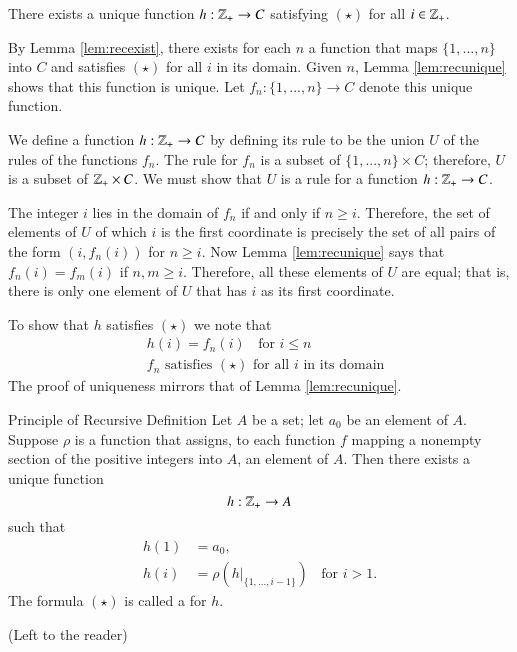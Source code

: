 \documentclass[12pt, a4paper, twoside, openright, titlepage]{book}
\begin{document}
\begin{appendices}
    \begin{thm}{}{}
        There exists a unique function $h:\mathbb Z_+\rightarrow C$ satisfying $(\star)$ for all $i \in \mathbb Z_+$.
    \end{thm}
    \begin{proof*}{}{}
        By Lemma \ref{lem:recexist}, there exists for each $n$ a function that maps $\{1,...,n\}$ into $C$ and satisfies $(\star)$ for all $i$ in its domain. Given $n$, Lemma \ref{lem:recunique} shows that this function is unique. Let $f_n:\{1,...,n\}\rightarrow C$ denote this unique function.


        We define a function $h:\mathbb Z_+\rightarrow C$ by defining its rule to be the union $U$ of the rules of the functions $f_n$. The rule for $f_n$ is a subset of $\{1,...,n\}\times C$; therefore, $U$ is a subset of $\mathbb Z_+\times C$. We must show that $U$ is a rule for a function $h:\mathbb Z_+\rightarrow C$.

        The integer $i$ lies in the domain of $f_n$ if and only if $n \geq i$. Therefore, the set of elements of $U$ of which $i$ is the first coordinate is precisely the set of all pairs of the form $(i,f_n(i))$ for $n \geq i$. Now Lemma \ref{lem:recunique} says that $f_n(i) = f_m(i)$ if $n,m \geq i$. Therefore, all these elements of $U$ are equal; that is, there is only one element of $U$ that has $i$ as its first coordinate.

        To show that $h$ satisfies $(\star)$ we note that \begin{align*}
            &h(i) = f_n(i)\;\;\text{ for } i \leq n \\
            &f_n\text{ satisfies $(\star)$ for all $i$ in its domain}
        \end{align*}
        The proof of uniqueness mirrors that of Lemma \ref{lem:recunique}.
    \end{proof*}

    \begin{namthm}{Principle of Recursive Definition}{}
        Let $A$ be a set; let $a_0$ be an element of $A$. Suppose $\rho$ is a function that assigns, to each function $f$ mapping a nonempty section of the positive integers into $A$, an element of $A$. Then there exists a unique function \begin{equation*}
            h:\mathbb Z_+\rightarrow A
        \end{equation*}
        such that \begin{equation*}
            \begin{array}{cl} h(1) &= a_0, \\
                h(i) &= \rho(h\rvert_{\{1,...,i-1\}})\;\;\text{ for } i > 1.
            \end{array} \tag{$(\star)$}
        \end{equation*}
        The formula $(\star)$ is called a  for $h$. 
    \end{namthm}
    \begin{proof*}{}{}
        (Left to the reader)
    \end{proof*}



\end{appendices}
\end{document}
